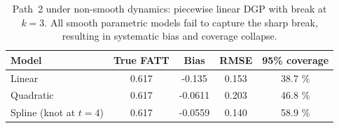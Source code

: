 \begin{table}[htbp]
\centering
\caption{Path~2 under non-smooth dynamics: piecewise linear DGP with break at \(k=3\).
All smooth parametric models fail to capture the sharp break, resulting in systematic bias
and coverage collapse.}
\label{tab:section8_1}
\begin{tabular}{lcccc}
\toprule
Model & True FATT & Bias & RMSE & 95\% coverage \\
\midrule
Linear &
0.617
 &
-0.135
 &
0.153
 &
38.7
\% \\
Quadratic &
0.617
 &
-0.0611
 &
0.203
 &
46.8
\% \\
Spline (knot at \(t=4\)) &
0.617
 &
-0.0559
 &
0.140
 &
58.9
\% \\
\bottomrule
\end{tabular}
\end{table}

